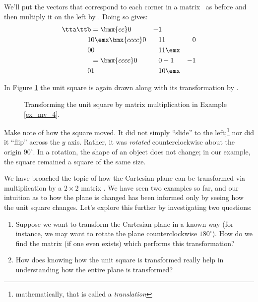 {We'll put the vectors that correspond to each corner in a matrix \ttb\ as before and then multiply it on the left by \tta. Doing so gives:
\begin{align*}
\tta\ttb &= \bmx{cc}0&-1\\1&0\emx \bmx{cccc}0&1&1&0\\0&0&1&1\emx\\
				& = \bmx{cccc}0 & 0&-1&-1\\0&1&1&0\emx
\end{align*}

In Figure \ref{fig:mv_4} the unit square is again drawn along with its transformation by \tta.

\begin{figure}
\begin{center}
\end{center}
\caption{Transforming the unit square by matrix multiplication in Example \ref{ex_mv_4}.}
\label{fig:mv_4}
\end{figure}

Make note of how the square moved. It did not simply ``slide'' to the left;\footnote{mathematically, that is called a \textit{translation}} nor did it ``flip'' across the $y$ axis. Rather, it was \textit{rotated} counterclockwise about the origin $90^\circ$. In a rotation, the shape of an object does not change; in our example, the square remained a square of the same size.
}

We have broached the topic of how the Cartesian plane can be transformed via multiplication by a $2\times 2$ matrix \tta. We have seen two examples so far, and our intuition as to how the plane is changed has been informed only by seeing how the unit square changes. Let's explore this further by investigating two questions:
	\begin{enumerate}
	\item		Suppose we want to transform the Cartesian plane in a known way (for instance, we may want to rotate the plane counterclockwise $180^\circ$). How do we find the matrix (if one even exists) which performs this transformation? 
	\item		How does knowing how the unit square is transformed really help in understanding how the entire plane is transformed?
	\end{enumerate}

